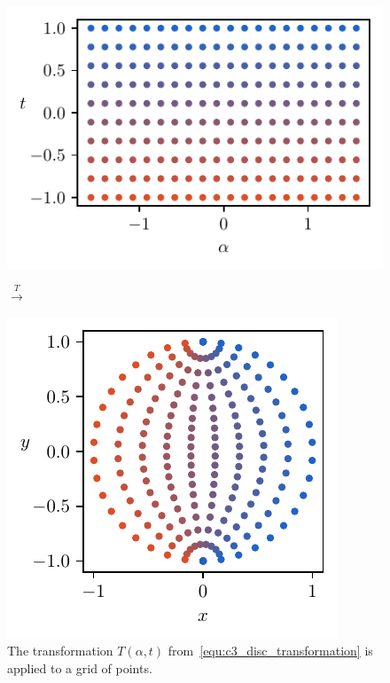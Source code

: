 \begin{figure}
  \begin{center}
    \begin{minipage}{.53\textwidth}
      \includegraphics[scale=.75]{img/chapter3/on_disc/disc_original.pdf}%
    \end{minipage}\begin{minipage}{.05\textwidth}\begin{center}
        \Large $ \xrightarrow{T} $
      \end{center}
    \end{minipage}\begin{minipage}{.42\textwidth}\centering
      \includegraphics[scale=.75]{img/chapter3/on_disc/disc_transformed.pdf}
    \end{minipage}
  \end{center}
  \caption{The transformation $T(\alpha, t)$ from~\eqref{equ:c3_disc_transformation} is applied to a grid of points.}
  \label{fig:c3_disc_transformation}
\end{figure}

